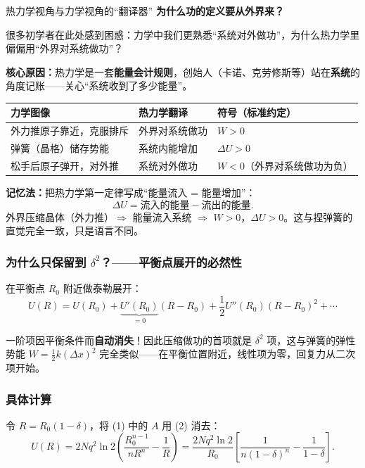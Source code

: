 \begin{insightbox}{热力学视角与力学视角的``翻译器''}
\textbf{为什么功的定义要从外界来？}

很多初学者在此处感到困惑：力学中我们更熟悉``系统对外做功''，为什么热力学里偏偏用``外界对系统做功''？

\textbf{核心原因：}热力学是一套\textbf{能量会计规则}，创始人（卡诺、克劳修斯等）站在\textbf{系统}的角度记账——关心``系统收到了多少能量''。

\begin{center}
\renewcommand{\arraystretch}{1.4}
\begin{tabular}{|l|l|l|}
\hline
\textbf{力学图像} & \textbf{热力学翻译} & \textbf{符号（标准约定）} \\
\hline
外力推原子靠近，克服排斥 & 外界对系统做功 & $W > 0$ \\
弹簧（晶格）储存势能 & 系统内能增加 & $\Delta U > 0$ \\
松手后原子弹开，对外推 & 系统对外做功 & $W < 0$（外界对系统做功为负） \\
\hline
\end{tabular}
\end{center}

\textbf{记忆法：}把热力学第一定律写成``能量流入 = 能量增加''：
\[
  \Delta U = \text{流入的能量} - \text{流出的能量}.
\]
外界压缩晶体（外力推）$\Rightarrow$ 能量流入系统 $\Rightarrow$ $W>0$，$\Delta U>0$。这与捏弹簧的直觉完全一致，只是语言不同。
\end{insightbox}

\subsubsection{为什么只保留到 $\delta^2$？——平衡点展开的必然性}

在平衡点 $R_0$ 附近做泰勒展开：
\[
  U(R) = U(R_0) + \underbrace{U'(R_0)}_{=0}(R-R_0) + \frac{1}{2}U''(R_0)(R-R_0)^2 + \cdots
\]

一阶项因平衡条件而\textbf{自动消失}！因此压缩做功的首项就是 $\delta^2$ 项，这与弹簧的弹性势能 $W=\frac{1}{2}k(\Delta x)^2$ 完全类似——在平衡位置附近，线性项为零，回复力从二次项开始。

\subsubsection{具体计算}

令 $R = R_0(1-\delta)$，将 (1) 中的 $A$ 用 (2) 消去：
\[
  U(R) = 2Nq^2\ln 2\left(\frac{R_0^{n-1}}{nR^n} - \frac{1}{R}\right)
       = \frac{2Nq^2\ln 2}{R_0}\left[\frac{1}{n(1-\delta)^n} - \frac{1}{1-\delta}\right].
\]

